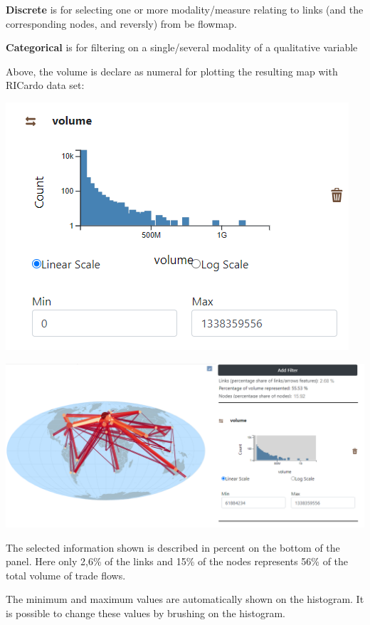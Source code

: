 \documentclass[
  letterpaper,
  DIV=11,
  numbers=noendperiod]{scrreprt}
\begin{document}
\textbf{Discrete} is for selecting one or more modality/measure relating
to links (and the corresponding nodes, and reversly) from be flowmap.

\textbf{Categorical} is for filtering on a single/several modality of a
qualitative variable

Above, the volume is declare as numeral for plotting the resulting map
with RICardo data set:

\includegraphics{images/Add_links_filter_volume_histogramme.png}

\begin{center}
\includegraphics{images/RICardo_filter_links_continuous.png}
\end{center}

The selected information shown is described in percent on the bottom of
the panel. Here only 2,6\% of the links and 15\% of the nodes represents
56\% of the total volume of trade flows.

The minimum and maximum values are automatically shown on the histogram.
It is possible to change these values by brushing on the histogram.
\end{document}
